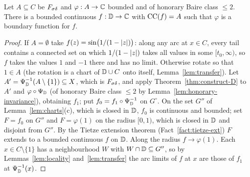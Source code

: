 \begin{theorem}\label{thm:construct-E}
Let $A\subseteq C$ be $F_{\sigma\delta}$ and $\varphi:A\to\mathbb{C}$ bounded and of honorary Baire class $\le2$. There is a bounded continuous
$f:\mathbb{D}\to\mathbb{C}$ with $\operatorname{CC}(f)=A$ such that $\varphi$ is a boundary function for $f$.
\end{theorem}
\begin{proof}
If $A=\emptyset$ take $f(z)=\sin\bigl(1/(1-\lvert z\rvert)\bigr)$: along any arc at $x\in C$, every tail contains a connected set on
which $1/(1-\lvert z\rvert)$ takes all values in some $[t_0,\infty)$, so $f$ takes the values $1$ and $-1$ there and has no limit. Otherwise rotate so that $1\in A$ (the rotation is a chart of $\mathbb{D}\cup C$ onto itself, Lemma~\ref{lem:transfer}). Let $A'=\Psi_{\mathbb{D}}^{-1}(A\setminus\{1\})\subseteq X$, which is $F_{\sigma\delta}$, and
apply Theorem~\ref{thm:construct-D} to $A'$ and $\varphi\circ\Psi_{\mathbb{D}}$ (of honorary Baire class $\le2$ by
Lemma~\ref{lem:honorary-invariance}), obtaining $f_1$; put $f_0=f_1\circ\Psi_{\mathbb{D}}^{-1}$ on
$G^\circ$. On the set $G''$ of Lemma~\ref{lem:charts}(c), which is closed in $\mathbb{D}$, $f_0$ is continuous and bounded; set
$F=f_0$ on $G''$ and $F=\varphi(1)$ on the radius $[0,1)$, which is closed in $\mathbb{D}$ and disjoint from $G''$. By the Tietze
extension theorem (Fact~\ref{fact:tietze-ext}) $F$ extends to a bounded continuous $f$ on $\mathbb{D}$. Along the radius $f\to\varphi(1)$. Each $x\in
C\setminus\{1\}$ has a neighbourhood $W$ with $W\cap\mathbb{D}\subseteq G''$, so by Lemmas~\ref{lem:locality}
and~\ref{lem:transfer} the arc limits of $f$ at $x$ are those of $f_1$ at $\Psi_{\mathbb{D}}^{-1}(x)$.
\end{proof}

